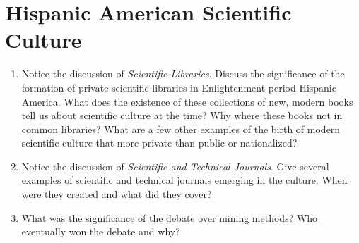 \documentclass[10pt]{article}
\begin{document}
\section{Hispanic American Scientific Culture}

\begin{enumerate}
\item Notice the discussion of \textit{Scientific Libraries}.  Discuss the significance of the formation of private scientific libraries in Enlightenment period Hispanic America.  What does the existence of these collections of new, modern books tell us about scientific culture at the time?  Why where these books not in common libraries?  What are a few other examples of the birth of modern scientific culture that more private than public or nationalized? \vspace{3cm}
\item Notice the discussion of \textit{Scientific and Technical Journals}.  Give several examples of scientific and technical journals emerging in the culture.  When were they created and what did they cover? \vspace{2cm}
\item What was the significance of the debate over mining methods?  Who eventually won the debate and why?
\end{enumerate}
\end{document}
